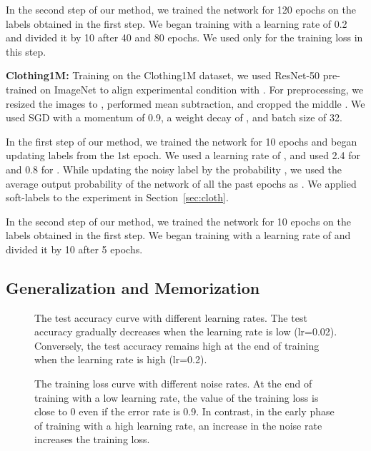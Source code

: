 \documentclass[10pt,twocolumn,letterpaper]{article}
\newcommand{\Sref}[1]{Section~\ref{#1}}
\begin{document}
In the second step of our method, we trained the network for 120 epochs on the labels obtained in the first step. We began training with a learning rate of 0.2 and divided it by 10 after 40 and 80 epochs. We used only  for the training loss in this step.

\vspace{2mm}\noindent\textbf{Clothing1M:}
Training on the Clothing1M dataset, we used ResNet-50 pre-trained on ImageNet to align experimental condition with \cite{patrini2016making}.
For preprocessing, we resized the images to , performed mean subtraction, and cropped the middle . We used SGD with a momentum of 0.9, a weight decay of , and batch size of 32.

In the first step of our method, we trained the network for 10 epochs and began updating labels from the 1st epoch. We used a learning rate of , and used 2.4 for  and 0.8 for . While updating the noisy label  by the probability , we used the average output probability of the network of all the past epochs as . We applied soft-labels to the experiment in \Sref{sec:cloth}.

In the second step of our method, we trained the network for 10 epochs on the labels obtained in the first step. We began training with a learning rate of  and divided it by 10 after 5 epochs.

\subsection{Generalization and Memorization}\label{sec:prelim}
\begin{figure}[tb]
  \vspace{-6mm}
  \centering
  \caption{The test accuracy curve with different learning rates. The test accuracy gradually decreases when the learning rate is low (lr=0.02). Conversely, the test accuracy remains high at the end of training when the learning rate is high (lr=0.2).}
  \label{fig:acc}
  \vspace{-3mm}
\end{figure}
\begin{figure}[tb]
  \centering
  \caption{The training loss curve with different noise rates. At the end of training with a low learning rate, the value of the training loss is close to 0 even if the error rate is 0.9. In contrast, in the early phase of training with a high learning rate, an increase in the noise rate increases the training loss.}
  \label{fig:loss}
  \vspace{-3mm}
\end{figure}
\end{document}
